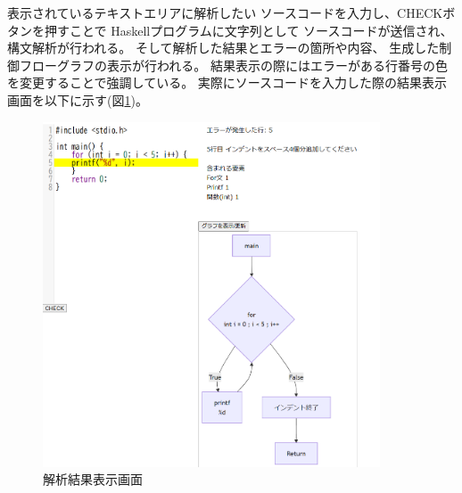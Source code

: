 \documentclass{cssspaper}
\begin{document}
        表示されているテキストエリアに解析したい
        ソースコードを入力し、CHECKボタンを押すことで
        Haskellプログラムに文字列として
        ソースコードが送信され、構文解析が行われる。
        そして解析した結果とエラーの箇所や内容、
        生成した制御フローグラフの表示が行われる。
        結果表示の際にはエラーがある行番号の色を変更することで強調している。
        実際にソースコードを入力した際の結果表示画面を以下に示す(図\ref{fig:systemuse2})。

        \begin{figure}[h]
            \centering
            \includegraphics[width=10cm]{systemuse2.png}
            \caption{解析結果表示画面}
            \label{fig:systemuse2}
        \end{figure}
\end{document}
